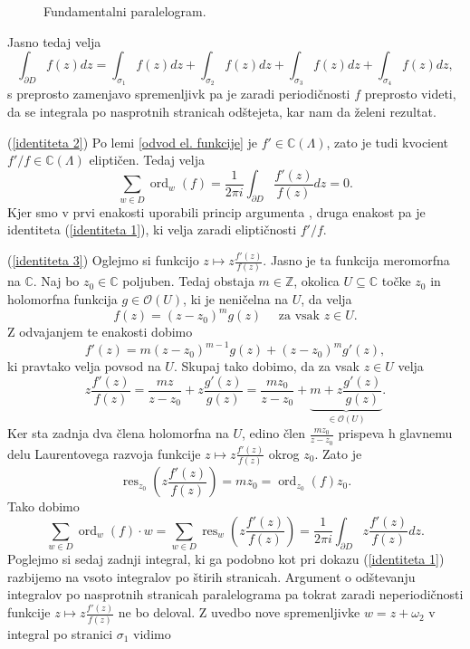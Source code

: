 \documentclass[mat1]{fmfdelo}
\newcommand{\Z}{\mathbb Z}
\newcommand{\C}{\mathbb C}
\newcommand{\elf}{\C(\Lambda)}
\newcommand{\res}[2]{\operatorname{res}_{#1}(#2)}
\newcommand{\ord}[2]{\operatorname{ord}_{#1}(#2)}
\newcommand{\hol}[1]{\mathcal{O}(#1)}
\theoremstyle{definition}
\begin{document}
\begin{dokaz}
\begin{figure}[H]
        \caption{Fundamentalni paralelogram.}
        \label{fundamentalni paralelogram}
    \end{figure}


    Jasno tedaj velja
    \[
        \int_{\partial D} f(z)dz = \int_{\sigma_1} f(z)dz + \int_{\sigma_2} f(z)dz + \int_{\sigma_3} f(z)dz + \int_{\sigma_4} f(z)dz,
    \]
    s preprosto zamenjavo spremenljivk pa je zaradi periodičnosti $f$ preprosto videti, da se integrala po nasprotnih stranicah odštejeta, kar nam da želeni rezultat. 
    \\
    \par
    (\ref{identiteta 2}) Po lemi \ref{odvod el. funkcije} je $f' \in \elf$, zato je tudi kvocient $f'/f \in \elf$ eliptičen. Tedaj velja
    \[
        \sum_{w \in D} \ord{w}{f} = \frac{1}{2\pi i}\int_{\partial D} \frac{f'(z)}{f(z)}dz = 0. 
    \]
    Kjer smo v prvi enakosti uporabili princip argumenta \cite[Izrek 72]{Globevnik}, druga enakost pa je identiteta (\ref{identiteta 1}), ki velja zaradi eliptičnosti $f'/f$.
    \\
    \par
    (\ref{identiteta 3}) Oglejmo si funkcijo $z \mapsto z \frac{f'(z)}{f(z)}$. Jasno je ta funkcija meromorfna na $\C$. Naj bo $z_0 \in \C$ poljuben. Tedaj obstaja $m \in \Z$, okolica $U \subseteq \C$ točke $z_0$ in holomorfna funkcija $g \in \hol{U}$, ki je neničelna na $U$, da velja
    \[
        f(z) = (z - z_0)^m g(z) \quad \text{ za vsak $z \in U$.}  
    \]
    Z odvajanjem te enakosti dobimo
    \[
        f'(z) = m(z - z_0)^{m - 1} g(z) + (z - z_0)^m g'(z),
    \]
    ki pravtako velja povsod na $U$. Skupaj tako dobimo, da za vsak $z \in U$ velja
    \[
        z\frac{f'(z)}{f(z)} = \frac{mz}{z-z_0} + z\frac{g'(z)}{g(z)} = \frac{mz_0}{z-z_0} + \underbrace{m + z\frac{g'(z)}{g(z)}}_{\in \hol{U}}.
    \]
    Ker sta zadnja dva člena holomorfna na $U$, edino člen $\frac{mz_0}{z-z_0}$ prispeva h glavnemu delu Laurentovega razvoja funkcije $z \mapsto z \frac{f'(z)}{f(z)}$ okrog $z_0$. Zato je 
    \[
        \operatorname{res}_{z_0} \left( z \frac{f'(z)}{f(z)} \right) = mz_0 = \ord{z_0}{f}z_0.  
    \]
    Tako dobimo 
    \[
        \sum_{w \in D} \ord{w}{f}\cdot w 
        = \sum_{w \in D} \operatorname{res}_{w} \left( z \frac{f'(z)}{f(z)} \right)
        = \frac{1}{2 \pi i} \int_{\partial D} z \frac{f'(z)}{f(z)}dz. 
    \] 
    Poglejmo si sedaj zadnji integral, ki ga podobno kot pri dokazu (\ref{identiteta 1}) razbijemo na vsoto integralov po štirih stranicah. Argument o odštevanju integralov po nasprotnih stranicah paralelograma pa tokrat zaradi neperiodičnosti funkcije $z \mapsto z \frac{f'(z)}{f(z)}$ ne bo deloval. Z uvedbo nove spremenljivke $w = z + \omega_2$ v integral po stranici $\sigma_1$ vidimo

\end{dokaz}
\end{document}
